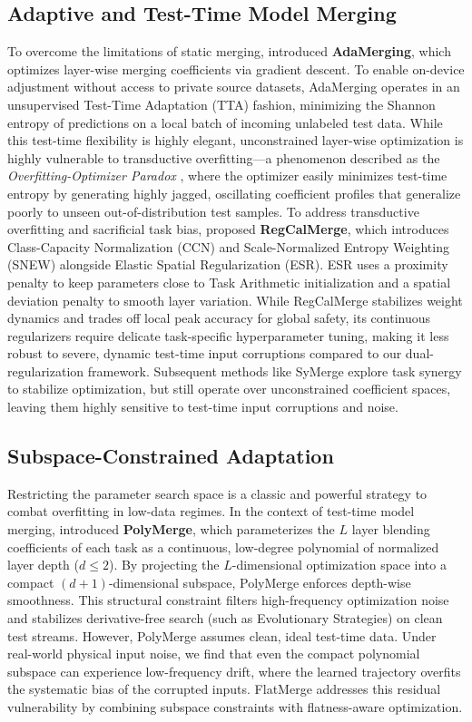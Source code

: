 \subsection{Adaptive and Test-Time Model Merging}
To overcome the limitations of static merging, \citet{yang2024adamerging} introduced \textbf{AdaMerging}, which optimizes layer-wise merging coefficients via gradient descent. 
To enable on-device adjustment without access to private source datasets, AdaMerging operates in an unsupervised Test-Time Adaptation (TTA) fashion, minimizing the Shannon entropy of predictions on a local batch of incoming unlabeled test data. 
While this test-time flexibility is highly elegant, unconstrained layer-wise optimization is highly vulnerable to transductive overfitting—a phenomenon described as the \emph{Overfitting-Optimizer Paradox} \cite{yang2024adamerging}, where the optimizer easily minimizes test-time entropy by generating highly jagged, oscillating coefficient profiles that generalize poorly to unseen out-of-distribution test samples. 
To address transductive overfitting and sacrificial task bias, \citet{regcalmerge} proposed \textbf{RegCalMerge}, which introduces Class-Capacity Normalization (CCN) and Scale-Normalized Entropy Weighting (SNEW) alongside Elastic Spatial Regularization (ESR). ESR uses a proximity penalty to keep parameters close to Task Arithmetic initialization and a spatial deviation penalty to smooth layer variation. While RegCalMerge stabilizes weight dynamics and trades off local peak accuracy for global safety, its continuous regularizers require delicate task-specific hyperparameter tuning, making it less robust to severe, dynamic test-time input corruptions compared to our dual-regularization framework.
Subsequent methods like SyMerge \cite{jung2025symerge} explore task synergy to stabilize optimization, but still operate over unconstrained coefficient spaces, leaving them highly sensitive to test-time input corruptions and noise.

\subsection{Subspace-Constrained Adaptation}
Restricting the parameter search space is a classic and powerful strategy to combat overfitting in low-data regimes. 
In the context of test-time model merging, \citet{polymerge} introduced \textbf{PolyMerge}, which parameterizes the $L$ layer blending coefficients of each task as a continuous, low-degree polynomial of normalized layer depth ($d \le 2$). 
By projecting the $L$-dimensional optimization space into a compact $(d+1)$-dimensional subspace, PolyMerge enforces depth-wise smoothness. 
This structural constraint filters high-frequency optimization noise and stabilizes derivative-free search (such as Evolutionary Strategies) on clean test streams. 
However, PolyMerge assumes clean, ideal test-time data. 
Under real-world physical input noise, we find that even the compact polynomial subspace can experience low-frequency drift, where the learned trajectory overfits the systematic bias of the corrupted inputs. 
FlatMerge addresses this residual vulnerability by combining subspace constraints with flatness-aware optimization.


